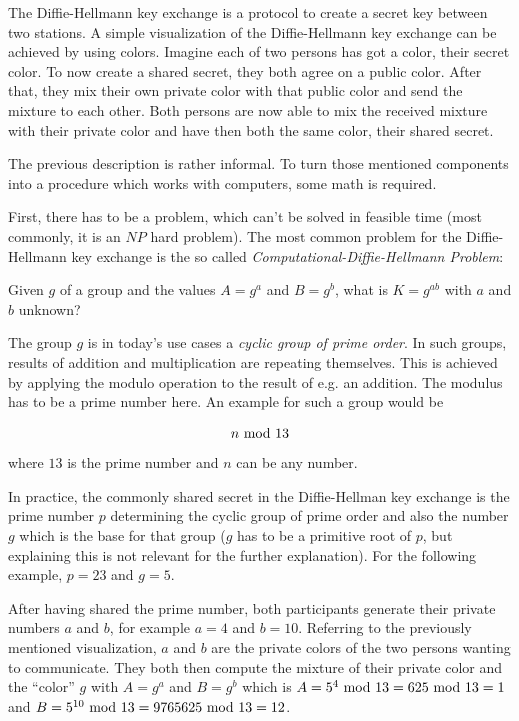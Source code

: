 The Diffie-Hellmann key exchange is a protocol to create a secret key between
two stations. A simple visualization of the Diffie-Hellmann key exchange can
be achieved by using colors. Imagine each of two persons has got a color,
their secret color. To now create a shared secret, they both agree on a
public color. After that, they mix their own private color with that public
color and send the mixture to each other. Both persons are now able to mix
the received mixture with their private color and have then both the same
color, their shared secret.

The previous description is rather informal. To turn those mentioned components
into a procedure which works with computers, some math is required.

First, there has to be a problem, which can't be solved in feasible time
(most commonly, it is an $NP$ hard problem). The most common problem for
the Diffie-Hellmann key exchange is the so called
\textit{Computational-Diffie-Hellmann Problem}:

\vspace{1em}

Given $g$ of a group and the values $A = g^a$ and $B = g^b$, what is
$K = g^{ab}$ with $a$ and $b$ unknown?

\vspace{1em}

The group $g$ is in today's use cases a \textit{cyclic group of prime order}.
In such groups, results of addition and multiplication are repeating
themselves. This is achieved by applying the modulo operation to the result
of e.g. an addition. The modulus has to be a prime number here. An example
for such a group would be

$$n \ \text{mod}\ 13$$ where $13$ is the prime number and $n$ can be any number.

In practice, the commonly shared secret in the Diffie-Hellman key exchange
is the prime number $p$ determining the cyclic group of prime order and also
the number $g$ which is the base for that group ($g$ has to be a primitive
root of $p$, but explaining this is not relevant for the further explanation).
For the following example, $p = 23$ and $g = 5$.

After having shared the prime number, both participants generate their
private numbers $a$ and $b$, for example $a = 4$ and $b = 10$. Referring to the
previously mentioned visualization, $a$ and $b$ are the private colors of the
two persons wanting to communicate. They both then compute the mixture of their
private color and the ``color'' $g$ with $A = g^a$ and $B = g^b$ which is
$A = 5^4 \ \text{mod}\ 13 = 625 \ \text{mod}\ 13 = 1$ and $B = 5^{10} \ \text{mod}\ 13 = 9765625 \ \text{mod}\ 13 = 12$.

